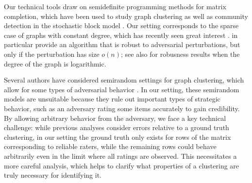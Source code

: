 Our technical tools draw on semidefinite programming methods for matrix 
completion, which have been used to study graph clustering as well 
as community detection in the stochastic block model . 
Our setting corresponds to the sparse case of graphs with constant degree, 
which has recently seen great interest . 
 in particular provide an algorithm that is 
robust to adversarial perturbations, but only if the perturbation has 
size $o(n)$; see also  for robusness results when 
the degree of the graph is logarithmic.

Several authors have considered semirandom settings for graph clustering, which 
allow for some types of adversarial behavior . 
In our setting, these semirandom models are unsuitable because they rule out 
important types of strategic behavior, such as an adversary rating some items 
accurately to gain credibility.
By allowing arbitrary behavior from the adversary, 
we face a key technical challenge: while previous 
analyses consider errors relative to a ground truth clustering, 
in our setting 
the ground truth only exists for rows of the matrix corresponding to reliable 
raters, while the remaining rows could behave arbitrarily even in the limit 
where all ratings are observed. This necessitates a more careful analysis, 
which helps to clarify what properties of a clustering are truly necessary 
for identifying it.


